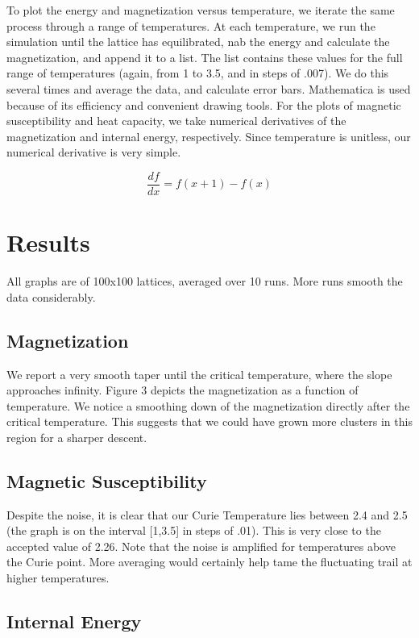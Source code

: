 \documentclass[a4paper]{article}
\begin{document}
To plot the energy and magnetization versus temperature, we iterate the same process through a range of temperatures. At each temperature, we run the simulation until the lattice has equilibrated, nab the energy and calculate the magnetization, and append it to a list. The list contains these values for the full range of temperatures (again, from 1 to 3.5, and in steps of .007). We do this several times and average the data, and calculate error bars. Mathematica is used because of its efficiency and convenient drawing tools. 
For the plots of magnetic susceptibility and heat capacity, we take numerical derivatives of the magnetization and internal energy, respectively. Since temperature is unitless, our numerical derivative is very simple. 

$$\frac{df}{dx} = f(x+1) - f(x) $$

\section{Results}

All graphs are of 100x100 lattices, averaged over 10 runs. More runs smooth the data considerably. 

\subsection{Magnetization}

We report a very smooth taper until the critical temperature, where the slope approaches infinity. Figure 3 depicts the magnetization as a function of temperature. We notice a smoothing down of the magnetization directly after the critical temperature. This suggests that we could have grown more clusters in this region for a sharper descent.

\subsection{Magnetic Susceptibility}

Despite the noise, it is clear that our Curie Temperature lies between 2.4 and 2.5 (the graph is on the interval [1,3.5] in steps of .01). This is very close to the accepted value of 2.26. Note that the noise is amplified for temperatures above the Curie point. More averaging would certainly help tame the fluctuating trail at higher temperatures.

\subsection{Internal Energy}
\end{document}
